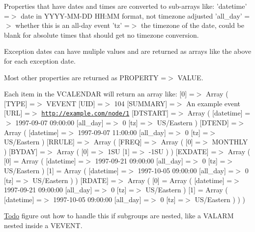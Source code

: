 Properties that have dates and times are converted to sub-\/arrays like: 'datetime' =$>$ date in YYYY-\/MM-\/DD HH:MM format, not timezone adjusted 'all\_\-day' =$>$ whether this is an all-\/day event 'tz' =$>$ the timezone of the date, could be blank for absolute times that should get no timezone conversion.

Exception dates can have muliple values and are returned as arrays like the above for each exception date.

Most other properties are returned as PROPERTY =$>$ VALUE.

Each item in the VCALENDAR will return an array like: \mbox{[}0\mbox{]} =$>$ Array ( \mbox{[}TYPE\mbox{]} =$>$ VEVENT \mbox{[}UID\mbox{]} =$>$ 104 \mbox{[}SUMMARY\mbox{]} =$>$ An example event \mbox{[}URL\mbox{]} =$>$ \href{http://example.com/node/1}{\tt http://example.com/node/1} \mbox{[}DTSTART\mbox{]} =$>$ Array ( \mbox{[}datetime\mbox{]} =$>$ 1997-\/09-\/07 09:00:00 \mbox{[}all\_\-day\mbox{]} =$>$ 0 \mbox{[}tz\mbox{]} =$>$ US/Eastern ) \mbox{[}DTEND\mbox{]} =$>$ Array ( \mbox{[}datetime\mbox{]} =$>$ 1997-\/09-\/07 11:00:00 \mbox{[}all\_\-day\mbox{]} =$>$ 0 \mbox{[}tz\mbox{]} =$>$ US/Eastern ) \mbox{[}RRULE\mbox{]} =$>$ Array ( \mbox{[}FREQ\mbox{]} =$>$ Array ( \mbox{[}0\mbox{]} =$>$ MONTHLY ) \mbox{[}BYDAY\mbox{]} =$>$ Array ( \mbox{[}0\mbox{]} =$>$ 1SU \mbox{[}1\mbox{]} =$>$ -\/1SU ) ) \mbox{[}EXDATE\mbox{]} =$>$ Array ( \mbox{[}0\mbox{]} = Array ( \mbox{[}datetime\mbox{]} =$>$ 1997-\/09-\/21 09:00:00 \mbox{[}all\_\-day\mbox{]} =$>$ 0 \mbox{[}tz\mbox{]} =$>$ US/Eastern ) \mbox{[}1\mbox{]} = Array ( \mbox{[}datetime\mbox{]} =$>$ 1997-\/10-\/05 09:00:00 \mbox{[}all\_\-day\mbox{]} =$>$ 0 \mbox{[}tz\mbox{]} =$>$ US/Eastern ) ) \mbox{[}RDATE\mbox{]} =$>$ Array ( \mbox{[}0\mbox{]} = Array ( \mbox{[}datetime\mbox{]} =$>$ 1997-\/09-\/21 09:00:00 \mbox{[}all\_\-day\mbox{]} =$>$ 0 \mbox{[}tz\mbox{]} =$>$ US/Eastern ) \mbox{[}1\mbox{]} = Array ( \mbox{[}datetime\mbox{]} =$>$ 1997-\/10-\/05 09:00:00 \mbox{[}all\_\-day\mbox{]} =$>$ 0 \mbox{[}tz\mbox{]} =$>$ US/Eastern ) ) )

\begin{Desc}
\item[\hyperlink{todo__todo000021}{Todo}]figure out how to handle this if subgroups are nested, like a VALARM nested inside a VEVENT.\end{Desc}


